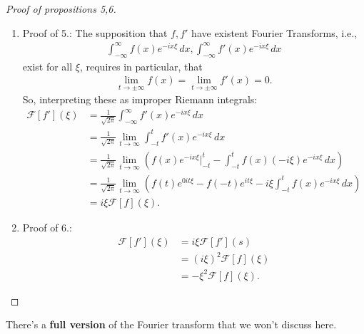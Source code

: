 \documentclass{article}
\theoremstyle{definition}
\newcommand{\F}{\mathcal{F}}
\begin{document}
\begin{proof}[Proof of propositions 5,6]
	\begin{enumerate}
		\item Proof of 5.: The supposition that $f,f'$ have existent Fourier Transforms, i.e.,
	\begin{align*}
	\int^\infty_{-\infty}f(x)e^{-ix\xi}\,dx, \int^\infty_{-\infty}f'(x)e^{-ix\xi}\,dx
	\end{align*}
	exist for all $\xi$, requires in particular, that
	\begin{align*}
	\lim_{t\to\pm\infty} f(x) = \lim_{t\to\pm\infty} f'(x) = 0.
	\end{align*}
	So, interpreting these as improper Riemann integrals:
	\begin{align*}
	\F[f'](\xi) &= \frac{1}{\sqrt{2\pi}}\int^\infty_{-\infty}f'(x)e^{-ix\xi}\,dx\\
	&= \frac{1}{\sqrt{2\pi}}\lim_{t\to\infty}\int^t_{-t}f'(x)e^{-ix\xi}\,dx\\
	&= \frac{1}{\sqrt{2\pi}}\lim_{t\to\infty}\left( f(x)e^{-ix\xi}\bigg\vert_{-t}^t - \int^t_{-t}f(x)(-i\xi)e^{-ix\xi}\,dx  \right)\\
	&= \frac{1}{\sqrt{2\pi}}\lim_{t\to\infty}\left( f(t)e^{0it\xi} - f(-t)e^{it\xi} -i\xi\int^t_{-t}f(x)e^{-ix\xi}\,dx \right)\\
	&= i\xi \F[f](\xi).
	\end{align*}
	
	\item Proof of 6.: 
	\begin{align*}
	\F[f'](\xi) &= i\xi\F[f'](s)\\
	&= (i\xi)^2\F[f](\xi)\\
	&= -\xi^2 \F[f](\xi).
	\end{align*}
	
	\end{enumerate}
\end{proof}


There's a \textbf{full version} of the Fourier transform that we won't discuss here.\\
\end{document}
